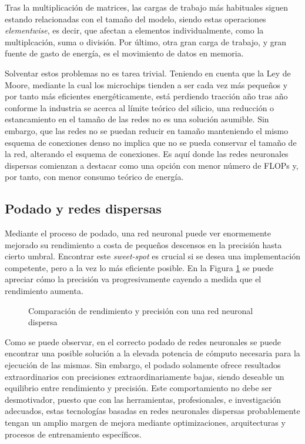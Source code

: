 Tras la multiplicación de matrices, las cargas de trabajo más habituales siguen estando relacionadas con el tamaño del modelo, siendo estas operaciones \textit{elementwise}, es decir, que afectan a elementos individualmente, como la multiplcación, suma o división. Por último, otra gran carga de trabajo, y gran fuente de gasto de energía, es el movimiento de datos en memoria.

Solventar estos problemas no es tarea trivial. Teniendo en cuenta que la Ley de Moore, mediante la cual los microchips tienden a ser cada vez más pequeños y por tanto más eficientes energéticamente, está perdiendo tracción año tras año conforme la industria se acerca al límite teórico del silicio, una reducción o estancamiento en el tamaño de las redes no es una solución asumible. Sin embargo, que las redes no se puedan reducir en tamaño manteniendo el mismo esquema de conexiones denso no implica que no se pueda conservar el tamaño de la red, alterando el esquema de conexiones. Es aquí donde las redes neuronales dispersas comienzan a destacar como una opción con menor número de FLOPs y, por tanto, con menor consumo teórico de energía.

\subsection{Podado y redes dispersas}
\label{ssec:podado_y_redes_dispersas}
Mediante el proceso de podado, una red neuronal puede ver enormemente mejorado su rendimiento a costa de pequeños descensos en la precisión hasta cierto umbral. Encontrar este \textit{sweet-spot} es crucial si se desea una implementación competente, pero a la vez lo más eficiente posible. En la Figura \ref{fig:grafica_sparse_vs_dense} \cite{neuralmagic_pruning_overview} se puede apreciar cómo la precisión va progresivamente cayendo a medida que el rendimiento aumenta.

\begin{figure}[h!]
    \centering
    \vspace*{0.5cm}
    \def\svgwidth{0.9\textwidth}
    
    \caption{Comparación de rendimiento y precisión con una red neuronal dispersa}
    \label{fig:grafica_sparse_vs_dense}
\end{figure}

Como se puede observar, en el correcto podado de redes neuronales se puede encontrar una posible solución a la elevada potencia de cómputo necesaria para la ejecución de las mismas. Sin embargo, el podado solamente ofrece resultados extraordinarios con precisiones extraordinariamente bajas, siendo deseable un equilibrio entre rendimiento y precisión. Este comportamiento no debe ser desmotivador, puesto que con las herramientas, profesionales, e investigación adecuados, estas tecnologías basadas en redes neuronales dispersas probablemente tengan un amplio margen de mejora mediante optimizaciones, arquitecturas y procesos de entrenamiento específicos.

